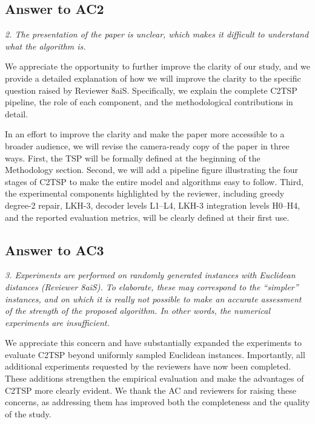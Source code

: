 \documentclass[10pt]{article}
\begin{document}
\subsection{Answer to AC2}

\textit{2. The presentation of the paper is unclear, which makes it difficult to understand what the algorithm is.}

We appreciate the opportunity to further improve the clarity of our study, and we provide a detailed explanation of how we will improve the clarity to the specific question raised by Reviewer 8aiS. Specifically, we explain the complete C2TSP pipeline, the role of each component, and the methodological contributions in detail.

In an effort to improve the clarity and make the paper more accessible to a broader audience, we will revise the camera-ready copy of the paper in three ways. First, the TSP will be formally defined at the beginning of the Methodology section. Second, we will add a pipeline figure illustrating the four stages of C2TSP to make the entire model and algorithms easy to follow. Third, the experimental components highlighted by the reviewer, including greedy degree-2 repair, LKH-3, decoder levels L1--L4, LKH-3 integration levels H0--H4, and the reported evaluation metrics, will be clearly defined at their first use.



\subsection{Answer to AC3}

\textit{3. Experiments are performed on randomly generated instances with Euclidean distances (Reviewer 8aiS). To elaborate, these may correspond to the ``simpler'' instances, and on which it is really not possible to make an accurate assessment of the strength of the proposed algorithm. In other words, the numerical experiments are insufficient.}

We appreciate this concern and have substantially expanded the experiments to evaluate C2TSP beyond uniformly sampled Euclidean instances. Importantly, all additional experiments requested by the reviewers have now been completed. These additions strengthen the empirical evaluation and make the advantages of C2TSP more clearly evident. We thank the AC and reviewers for raising these concerns, as addressing them has improved both the completeness and the quality of the study.
\end{document}

